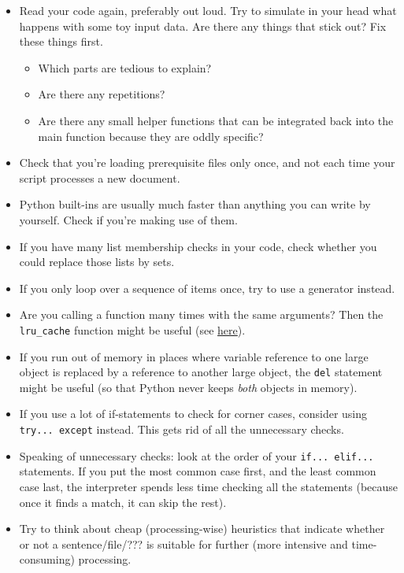 \documentclass[12pt]{book}
\begin{document}
\begin{itemize}
\item Read your code again, preferably out loud. Try to simulate in your head what happens with some toy input data. Are there any things that stick out? Fix these things first.
  \begin{itemize}
  \item Which parts are tedious to explain?
  \item Are there any repetitions?
  \item Are there any small helper functions that can be integrated back into the main function because they are oddly specific?
  \end{itemize}
\item Check that you're loading prerequisite files only once, and not each time your script processes a new document.
\item Python built-ins are usually much faster than anything you can write by yourself. Check if you're making use of them.
\item If you have many list membership checks in your code, check whether you could replace those lists by sets.
\item If you only loop over a sequence of items once, try to use a generator instead.
\item Are you calling a function many times with the same arguments? Then the \texttt{lru\_cache} function might be useful (see \href{https://docs.python.org/3/library/functools.html}{here}).
\item If you run out of memory in places where variable reference to one large object is replaced by a reference to another large object, the \texttt{del} statement might be useful (so that Python never keeps \emph{both} objects in memory).
\item If you use a lot of if-statements to check for corner cases, consider using \texttt{try...\ except} instead. This gets rid of all the unnecessary checks.
\item Speaking of unnecessary checks: look at the order of your \texttt{if...\ elif...} statements. If you put the most common case first, and the least common case last, the interpreter spends less time checking all the statements (because once it finds a match, it can skip the rest).
\item Try to think about cheap (processing-wise) heuristics that indicate whether or not a sentence/file/??? is suitable for further (more intensive and time-consuming) processing.
\end{itemize}
\end{document}
